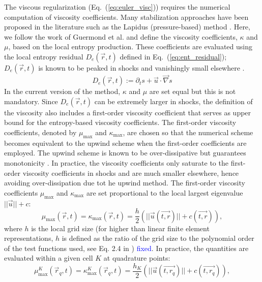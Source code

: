 \documentclass[preprint,10pt]{elsarticle}
\newcommand{\grad}{\vec{\nabla}}
\newcommand{\eqt}[1]{Eq.~(\ref{#1})}                     %
\newcommand{\tcb}[1]{\textcolor{blue}{#1}}
\begin{document}
The viscous regularization (\eqt{eq:euler_visc}) requires the numerical computation of viscosity coefficients. Many stabilization approaches have been proposed in the literature such as the Lapidus (pressure-based) method \cite{Lapidus_book, Lapidus_paper}. Here, we follow the work of Guermond et al. and define the viscosity coefficients, $\kappa$ and $\mu$, based on the local entropy production. These coefficients are evaluated using the local entropy residual $D_e(\vec{r},t)$ defined in \eqt{eq:ent_residual}; $D_e(\vec{r},t)$ is known to be peaked in shocks and vanishingly small elsewhere \cite{Toro}. 
%
\begin{equation}
\label{eq:ent_residual}
D_e(\vec{r}, t) := \partial_t s + \vec{u} \cdot \grad s
\end{equation}
%
In the current version of the method, $\kappa$ and $\mu$ are set equal but this is not mandatory. Since $D_e(\vec{r},t)$ can be extremely larger in shocks, the definition of the viscosity also includes a first-order viscosity coefficient that serves as upper bound for the entropy-based viscosity coefficients. The first-order viscosity coefficients, denoted by $\mu_{\max}$ and $\kappa_{\max}$, are chosen so that the numerical scheme becomes equivalent to the upwind scheme when the first-order coefficients are employed. The upwind scheme is known to be over-dissipative but guarantees monotonicity \cite{Toro}. In practice, the viscosity coefficients only saturate to the first-order viscosity coefficients in shocks and are much smaller elsewhere, hence avoiding over-dissipation due tot he upwind method.  The first-order viscosity coefficients $\mu_{\max}$ and $\kappa_{\max}$ are set proportional to the local largest eigenvalue $|| \vec{u} || + c $:
%
\begin{equation}
\label{eq:fo}
\mu_{\max}(\vec{r}, t) = \kappa_{\max}(\vec{r}, t) = \frac{h}{2} \left( || \vec{u}(\vec{t,r}) || + c(\vec{t,r}) \right),
\end{equation}
%
where $h$ is the local grid size (for higher than linear finite element representations, $h$ is defined as the ratio of the grid size to the polynomial order of the test functions used, see Eq. 2.4 in \cite{valentin}) \tcb{fixed}. In practice, the quantities are evaluated within a given cell $K$ at quadrature points:
%
\begin{equation}
\label{eq:fo_quad}
\mu^K_{\max}(\vec{r}_q, t) = \kappa^K_{\max}(\vec{r}_q, t) = \frac{h_K}{2} \left( || \vec{u}(\vec{t,r_q}) || + c(\vec{t,r_q}) \right),
\end{equation}
\end{document}
